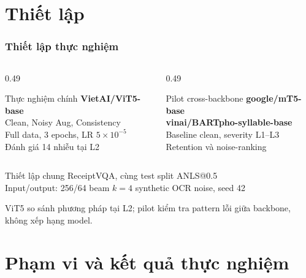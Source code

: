 \documentclass{beamer}
\begin{document}
\section{Thiết lập}

\begin{frame}
\frametitle{Thiết lập thực nghiệm}

\begin{columns}[T,onlytextwidth]
\begin{column}{0.49\textwidth}
\begin{block}{Thực nghiệm chính}
\textbf{VietAI/ViT5-base}\\
Clean, Noisy Aug, Consistency\\
Full data, 3 epochs, LR $5 \times 10^{-5}$\\
Đánh giá 14 nhiễu tại L2
\end{block}
\end{column}
\begin{column}{0.49\textwidth}
\begin{block}{Pilot cross-backbone}
\textbf{google/mT5-base}\\
\textbf{vinai/BARTpho-syllable-base}\\
Baseline clean, severity L1--L3\\
Retention và noise-ranking
\end{block}
\end{column}
\end{columns}

\vspace{0.15cm}
\begin{alertblock}{Thiết lập chung}
ReceiptVQA, cùng test split \quad ANLS@0.5\\
Input/output: 256/64 \quad beam $k=4$ \quad synthetic OCR noise, seed 42
\end{alertblock}

\scriptsize ViT5 so sánh phương pháp tại L2; pilot kiểm tra pattern lỗi giữa backbone, không xếp hạng model.

\end{frame}

\section{Phạm vi và kết quả thực nghiệm}
\end{document}
